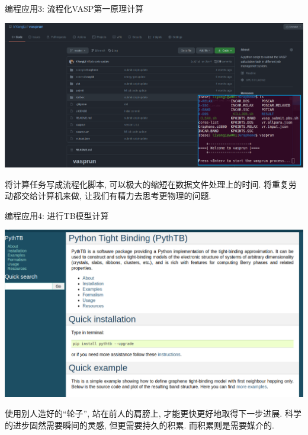 \documentclass{beamer}
\begin{document}
    \begin{frame}{编程应用3: 流程化VASP第一原理计算}
      \centering
      \begin{tcolorbox}[beamer,width=\textwidth,arc=0pt,boxsep=0pt,left=0pt,right=0pt,top=0pt,bottom=0pt]
        \includegraphics[width=\textwidth]{figure/vasprun.png}
      \end{tcolorbox}
    
      \begin{block}{}
        将计算任务写成流程化脚本, 可以极大的缩短在数据文件处理上的时间. 将重复劳动都交给计算机来做, 让我们有精力去思考更物理的问题.
      \end{block}
    \end{frame}
  
    \begin{frame}{编程应用4: 进行TB模型计算}
      \centering
      \begin{tcolorbox}[beamer,width=0.85\textwidth,arc=0pt,boxsep=0pt,left=0pt,right=0pt,top=0pt,bottom=0pt]
        \includegraphics[width=\textwidth]{figure/ptb.png}
      \end{tcolorbox}
    
      \begin{block}{}
        使用别人造好的``轮子'', 站在前人的肩膀上, 才能更快更好地取得下一步进展. 科学的进步固然需要瞬间的灵感, 但更需要持久的积累. 而积累则是需要媒介的.
      \end{block}
    \end{frame}
\end{document}

